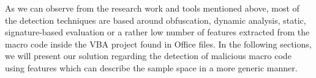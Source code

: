 \par
As we can observe from the research work and tools mentioned above, most of the detection techniques are based around obfuscation, dynamic analysis, static, signature-based evaluation or a rather low number of features extracted from the macro code inside the VBA project found in Office files.
In the following sections, we will present our solution regarding the detection of malicious macro code using features which can describe the sample space in a more generic manner.
